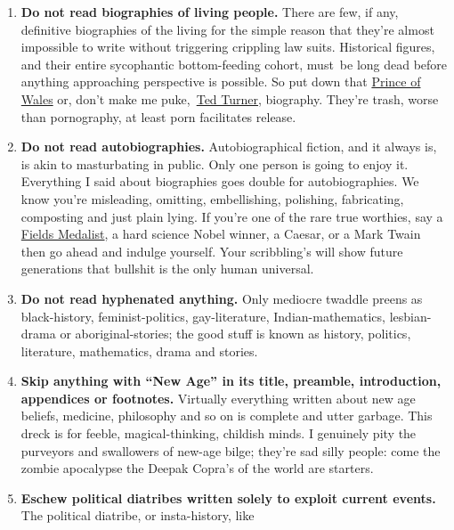 \begin{enumerate}
\item
  \textbf{Do not read biographies of living people.} There are few, if
  any, definitive biographies of the living for the simple reason that
  they're almost impossible to write without triggering crippling law
  suits. Historical figures, and their entire sycophantic bottom-feeding
  cohort, must~be long dead before anything approaching perspective is
  possible. So put down that
  \href{http://www.amazon.com/Prince-Wales-Biography-Jonathan-Dimbleby/dp/0688146155}{Prince
  of Wales} or, don't make me
  puke,~\href{http://www.barnesandnoble.com/w/ted-turner-michael-oconnor/1103045877?cm\_mmc=googlepla-\_-book-\_-q000000633-\_-9780313350429\&cm\_mmca2=pla\&ean=9780313350429\&isbn=9780313350429\&r=1}{Ted
  Turner}, biography. They're trash, worse than pornography, at least
  porn facilitates release.
\item
  \textbf{Do not read autobiographies.} Autobiographical fiction, and it
  always is, is akin to masturbating in public. Only one person is going
  to enjoy it. Everything I said about biographies goes double for
  autobiographies. We know you're misleading, omitting, embellishing,
  polishing, fabricating, composting and just plain lying. If you're one
  of the rare true worthies, say a
  \href{http://www.mathunion.org/general/prizes/fields/details/}{Fields
  Medalist}, a hard science Nobel winner, a Caesar, or a Mark Twain then
  go ahead and indulge yourself. Your scribbling's will show future
  generations that bullshit is the only human universal.
\item
  \textbf{Do not read hyphenated anything.} Only mediocre twaddle preens
  as black-history, feminist-politics, gay-literature,
  Indian-mathematics, lesbian-drama or aboriginal-stories; the good
  stuff is known as history, politics, literature, mathematics, drama
  and stories.
\item
  \textbf{Skip anything with ``New Age'' in its title, preamble,
  introduction, appendices or footnotes.} Virtually everything written
  about new age beliefs, medicine, philosophy and so on is complete and
  utter garbage. This dreck is for feeble, magical-thinking, childish
  minds. I genuinely pity the purveyors and swallowers of new-age bilge;
  they're sad silly people: come the zombie apocalypse the Deepak
  Copra's of the world are starters.
\item
  \textbf{Eschew political diatribes written solely to exploit current
  events.} The political diatribe, or insta-history, like

\end{enumerate}
